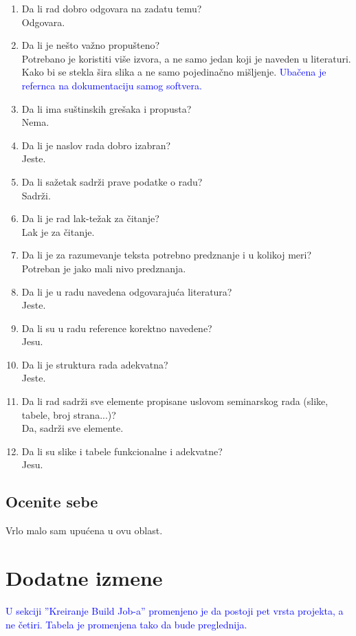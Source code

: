 \documentclass[a4paper]{report}
\newcommand{\odgovor}[1]{\textcolor{blue}{#1}}
\begin{document}
\begin{enumerate}
\item Da li rad dobro odgovara na zadatu temu?\\ Odgovara.
\item Da li je nešto važno propušteno?\\ Potrebano je koristiti više izvora, a ne samo jedan koji je naveden u literaturi. Kako bi se stekla šira slika a ne samo pojedinačno mišljenje. 
\odgovor{Ubačena je refernca na dokumentaciju samog softvera.}
\item Da li ima suštinskih grešaka i propusta?\\ Nema.
\item Da li je naslov rada dobro izabran?\\ Jeste. 
\item Da li sažetak sadrži prave podatke o radu?\\ Sadrži.
\item Da li je rad lak-težak za čitanje?\\ Lak je za čitanje.
\item Da li je za razumevanje teksta potrebno predznanje i u kolikoj meri?\\ Potreban je jako mali nivo predznanja.
\item Da li je u radu navedena odgovarajuća literatura?\\ Jeste. 
\item Da li su u radu reference korektno navedene?\\ Jesu.
\item Da li je struktura rada adekvatna?\\ Jeste. 
\item Da li rad sadrži sve elemente propisane uslovom seminarskog rada (slike, tabele, broj strana...)?\\ Da, sadrži sve elemente.
\item Da li su slike i tabele funkcionalne i adekvatne?\\ Jesu.
\end{enumerate}

\section{Ocenite sebe}
Vrlo malo sam upućena u ovu oblast. 

\chapter{Dodatne izmene}
\odgovor{U sekciji ''Kreiranje Build Job-a'' promenjeno je da postoji pet vrsta projekta, a ne četiri. Tabela je promenjena tako da bude preglednija.}
\end{document}
